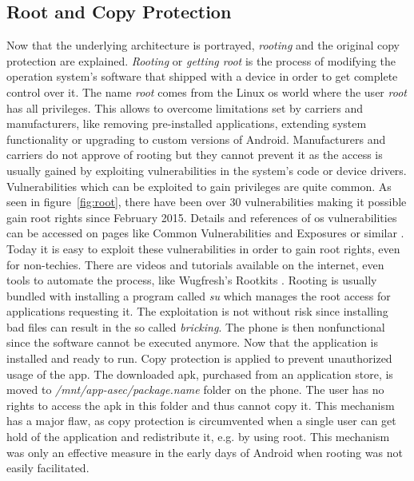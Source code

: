 \subsection{Root and Copy Protection} \label{subsection:android-copyroot}
Now that the underlying architecture is portrayed, \textit{rooting} and the original copy protection are explained.
\textit{Rooting} or \textit{getting root} is the process of modifying the operation system's software that shipped with a device in order to get complete control over it.
The name \textit{root} comes from the Linux \gls{os} world where the user \textit{root} has all privileges.
This allows to overcome limitations set by carriers and manufacturers, like removing pre-installed applications, extending system functionality or upgrading to custom versions of Android.
Manufacturers and carriers do not approve of rooting but they cannot prevent it as the access is usually gained by exploiting vulnerabilities in the system's code or device drivers.
Vulnerabilities which can be exploited to gain privileges are quite common.
As seen in figure~\ref{fig:root}, there have been over 30 vulnerabilities making it possible gain root rights since February 2015.
Details and references of \gls{os} vulnerabilities can be accessed on pages like Common Vulnerabilities and Exposures or similar \cite{cveAndroidPriv} \cite{cveDetails}.
\newline
Today it is easy to exploit these vulnerabilities in order to gain root rights, even for non-techies.
There are videos and tutorials available on the internet, even tools to automate the process, like Wugfresh's Rootkits \cite{wugfresh}.
Rooting is usually bundled with installing a program called \textit{su} which manages the root access for applications requesting it.
The exploitation is not without risk since installing bad files can result in the so called \textit{bricking}.
The phone is then nonfunctional since the software cannot be executed anymore.
 \cite{androidpoliceRoot}
\newline
Now that the application is installed and ready to run.
Copy protection is applied to prevent unauthorized usage of the app.
The downloaded \gls{apk}, purchased from an application store, is moved to \textit{/mnt/app-asec/package.name} folder on the phone.
The user has no rights to access the \gls{apk} in this folder and thus cannot copy it.
This mechanism has a major flaw, as copy protection is circumvented when a single user can get hold of the application and redistribute it, e.g. by using root.
This mechanism was only an effective measure in the early days of Android when rooting was not easily facilitated.

